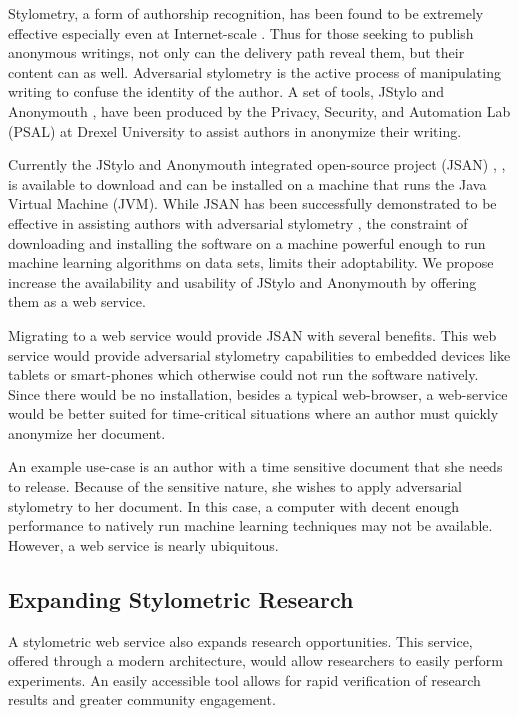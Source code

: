 \documentclass[letterpaper]{article}
\begin{document}
Stylometry, a form of authorship recognition, has been found to be
extremely effective especially even at
Internet-scale \cite{Narayanan:2012:FIA:2310656.2310687}.  Thus for
those seeking to publish anonymous writings, not only can the delivery
path reveal them, but their content can as well.  Adversarial
stylometry is the active process of manipulating writing to confuse
the identity of the author.  A set of tools, JStylo and
Anonymouth \cite{conf/pet/McDonaldACSG12}, have been produced by the
Privacy, Security, and Automation Lab (PSAL) at Drexel University to
assist authors in anonymize their writing.

Currently the JStylo and Anonymouth integrated open-source project
(JSAN) \cite{BrennanG09}, \cite{journals/tissec/BrennanAG12},
\cite{conf/pet/McDonaldACSG12} is available to download and can be installed on a machine that
runs the Java Virtual Machine (JVM).  While JSAN has been successfully
demonstrated to be effective in assisting authors with adversarial
stylometry \cite{journals/tissec/BrennanAG12}, the constraint of
downloading and installing the software on a machine powerful enough
to run machine learning algorithms on data sets, limits their
adoptability.  We propose increase the availability and usability of
JStylo and Anonymouth by offering them as a web service.

Migrating to a web service would provide JSAN with several benefits.
This web service would provide adversarial stylometry capabilities to
embedded devices like tablets or smart-phones which otherwise could
not run the software natively.  Since there would be no installation,
besides a typical web-browser, a web-service would be better suited
for time-critical situations where an author must quickly anonymize
her document.

An example use-case is an author with a time sensitive document that
she needs to release.  Because of the sensitive nature, she wishes to
apply adversarial stylometry to her document.  In this case, a
computer with decent enough performance to natively run machine
learning techniques may not be available.  However, a web service is
nearly ubiquitous.

\subsection{Expanding Stylometric Research}

A stylometric web service also expands research opportunities.  This
service, offered through a modern architecture, would allow
researchers to easily perform experiments.  An easily accessible tool
allows for rapid verification of research results and greater
community engagement.
\end{document}
